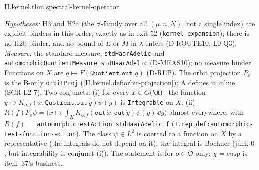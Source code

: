 \begin{tfformal}{II.kernel.thm:spectral-kernel-operator}
\begin{tffidelity}
\emph{Hypotheses:} H3 and H2a (the $\forall$-family over all $(\mu,n,N)$, not a single index) are explicit binders in this order, exactly as in exit 52 (\texttt{kernel\_expansion}); there is no H2b binder, and no bound of $\widetilde E$ or $\widetilde M$ in $\lambda$ enters (D-ROUTE10, L0 Q3). \emph{Measure:} the standard measure, \texttt{stdHaarAdelic} and \texttt{automorphicQuotientMeasure stdHaarAdelic} (D-MEAS10); no measure binder. Functions on $X$ are $q\mapsto F(\texttt{Quotient.out }q)$ (D-REP). The orbit projection $P_o$ is the B-only \texttt{orbitProj} (\cref{II.kernel.def:orbit-projection}); A defines it inline (SCR-L2-7). Two conjuncts: (i) for every $x\in G(\A)^1$ the function $\dot y\mapsto K_{o,f}(x,\texttt{Quotient.out}\,\dot y)\psi(\dot y)$ is \texttt{Integrable} on $X$; (ii) $R(f)P_o\psi=\bigl(\dot x\mapsto\int_XK_{o,f}(\texttt{out}\,\dot x,\texttt{out}\,\dot y)\psi(\dot y)\,\dd\dot y\bigr)$ almost everywhere, with $R(f)=$ \texttt{automorphicTestAction stdHaarAdelic f} (\texttt{I.rep.def:automorphic-test-function-action}). The class $\psi\in L^2$ is coerced to a function on $X$ by a representative (the integrals do not depend on it); the integral is Bochner (junk $0$, but integrability is conjunct (i)). The statement is for $o\in\mathfrak O$ only; $\chi=\mathrm{cusp}$ is item~37's business.
\end{tffidelity}
\end{tfformal}

